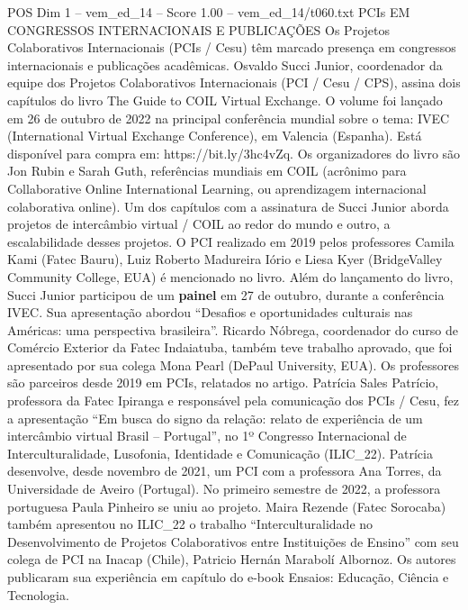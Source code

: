 \begin{textsample}{POS Dim 1 – vem\_ed\_14 – Score 1.00 – vem\_ed\_14/t060.txt}  \label{ex:f1_pos_072}
PCIs EM CONGRESSOS INTERNACIONAIS E PUBLICAÇÕES Os Projetos Colaborativos Internacionais (PCIs / Cesu) têm marcado presença em congressos internacionais e publicações acadêmicas.
Osvaldo Succi Junior, coordenador da equipe dos Projetos Colaborativos Internacionais (PCI / Cesu / CPS), assina dois capítulos do livro The Guide to COIL Virtual Exchange.
O volume foi lançado em 26 de outubro de 2022 na principal conferência mundial sobre o tema: IVEC (International Virtual Exchange Conference), em Valencia (Espanha).
Está disponível para compra em: https://bit.ly/3hc4vZq.
Os organizadores do livro são Jon Rubin e Sarah Guth, referências mundiais em COIL (acrônimo para Collaborative Online International Learning, ou aprendizagem internacional colaborativa online).
Um dos capítulos com a assinatura de Succi Junior aborda projetos de intercâmbio virtual / COIL ao redor do mundo e outro, a escalabilidade desses projetos.
O PCI realizado em 2019 pelos professores Camila Kami (Fatec Bauru), Luiz Roberto Madureira Iório e Liesa Kyer (BridgeValley Community College, EUA) é mencionado no livro.
Além do lançamento do livro, Succi Junior participou de um \textbf{painel} em 27 de outubro, durante a conferência IVEC.
Sua apresentação abordou “Desafios e oportunidades culturais nas Américas: uma perspectiva brasileira”.
Ricardo Nóbrega, coordenador do curso de Comércio Exterior da Fatec Indaiatuba, também teve trabalho aprovado, que foi apresentado por sua colega Mona Pearl (DePaul University, EUA).
Os professores são parceiros desde 2019 em PCIs, relatados no artigo.
Patrícia Sales Patrício, professora da Fatec Ipiranga e responsável pela comunicação dos PCIs / Cesu, fez a apresentação “Em busca do signo da relação: relato de experiência de um intercâmbio virtual Brasil – Portugal”, no 1º Congresso Internacional de Interculturalidade, Lusofonia, Identidade e Comunicação (ILIC\_22).
Patrícia desenvolve, desde novembro de 2021, um PCI com a professora Ana Torres, da Universidade de Aveiro (Portugal).
No primeiro semestre de 2022, a professora portuguesa Paula Pinheiro se uniu ao projeto.
Maira Rezende (Fatec Sorocaba) também apresentou no ILIC\_22 o trabalho “Interculturalidade no Desenvolvimento de Projetos Colaborativos entre Instituições de Ensino” com seu colega de PCI na Inacap (Chile), Patricio Hernán Marabolí Albornoz.
Os autores publicaram sua experiência em capítulo do e-book Ensaios: Educação, Ciência e Tecnologia.

\end{textsample}
